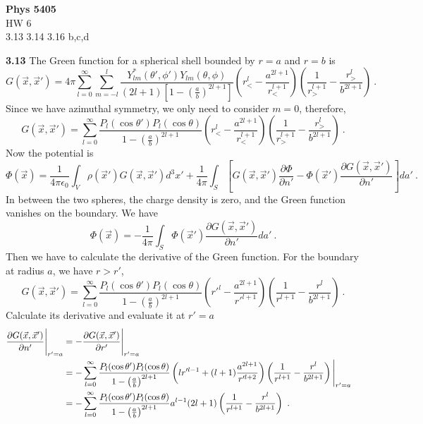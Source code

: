 \documentclass[12pt]{article}
\begin{document}
\begin{center}
{\bf Phys 5405}\\
HW 6 \\
3.13 3.14 3.16 b,c,d
\end{center}
{\bf 3.13}
The Green function for a spherical shell bounded by $r = a$ and $r = b$ is
\begin{equation}
    G(\vec x, \vec x') = 4\pi \sum_{l = 0}^\infty \sum_{m = -l}^l \frac{Y^*_{lm}(\theta', \phi') Y_{lm}(\theta, \phi)}{(2l+1)\left[1- \left(\frac{a}{b}\right)^{2l+1}\right]}\left(r^l_< - \frac{a^{2l+1}}{r^{l+1}_<}\right)\left(\frac{1}{r^{l+1}_>} - \frac{r^l_>}{b^{2l+1}}\right)~.
\end{equation}
Since we have azimuthal symmetry, we only need to consider $m = 0$, therefore,
\begin{equation}
    G(\vec x, \vec x') = \sum_{l = 0}^\infty\frac{P_l(\cos \theta') P_l(\cos \theta)}{1- \left(\frac{a}{b}\right)^{2l+1}}\left(r^l_< - \frac{a^{2l+1}}{r^{l+1}_<}\right)\left(\frac{1}{r^{l+1}_>} - \frac{r^l_>}{b^{2l+1}}\right)~.
\end{equation}
Now the potential is
\begin{equation}
    \Phi(\vec x) = \frac{1}{4\pi \epsilon_0} \int_V \rho(\vec x') G(\vec x, \vec x') d^3 x'+ \frac{1}{4\pi} \int_S\left[G(\vec x, \vec x') \frac{\partial \Phi}{\partial n'} - \Phi(\vec x') \frac{\partial G(\vec x, \vec x')}{\partial n'}\right]da'~.
\end{equation}
In between the two spheres, the charge density is zero, and the Green function vanishes on the boundary. We have
\begin{equation}
    \Phi(\vec x) = - \frac{1}{4\pi} \int_S \Phi(\vec x') \frac{\partial G(\vec x, \vec x')}{\partial n'} da'~.
\end{equation}
Then we have to calculate the derivative of the Green function. For the boundary at radius $a$, we have $r > r'$,
\begin{equation}
    G(\vec x, \vec x') = \sum_{l=0}^\infty  \frac{P_l(\cos \theta') P_l(\cos \theta)}{1 - \left(\frac{a}{b}\right)^{2l+1}} \left(r'^l - \frac{a^{2l+1}}{r'^{l+1}}\right) \left(\frac{1}{r^{l+1}} - \frac{r^l}{b^{2l+1}}\right)~.
\end{equation}
Calculate its derivative and evaluate it at $r' = a$
\begin{align}
    \frac{\partial G(\vec x, \vec x')}{\partial n'}\Bigg|_{r' = a} &= - \frac{\partial G(\vec x, \vec x')}{\partial r'} \Bigg |_{r' = a} \cr
    &= -\sum_{l=0}^\infty  \frac{P_l (\cos \theta')P_l(\cos \theta)}{1-\left(\frac{a}{b}\right)^{2l+1}}\left(l r'^{l-1} +(l+1)\frac{a^{2l+1}}{r'^{l+2}}\right) \left(\frac{1}{r^{l+1}} - \frac{r^l}{b^{2l+1}}\right) \Bigg |_{r' = a} \cr
    &=-\sum_{l=0}^\infty  \frac{P_l (\cos \theta')P_l(\cos \theta)}{1-\left(\frac{a}{b}\right)^{2l+1}}a^{l-1}(2l+1) \left(\frac{1}{r^{l+1}} - \frac{r^l}{b^{2l+1}}\right)~.
\end{align}
\end{document}
